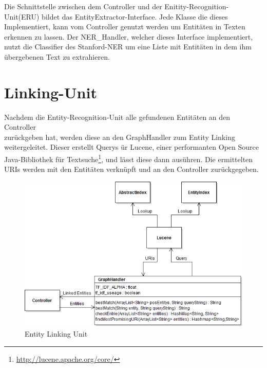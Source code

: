 \documentclass[11pt, a4paper, oneside]{Thesis} %
\begin{document}
Die Schnittstelle zwischen dem Controller und der Enitity-Recognition-Unit(ERU) bildet das EntityExtractor-Interface. Jede Klasse die dieses Implementiert, kann vom Controller genutzt werden um Entit\"aten in Texten erkennen zu lassen. Der NER\_Handler, welcher dieses Interface implementiert, nutzt die Classifier des Stanford-NER um eine Liste mit Entit\"aten in dem ihm \"ubergebenen Text zu extrahieren.

\section{Linking-Unit}
Nachdem die Entity-Recognition-Unit alle gefundenen Entit\"aten an den Controller\\ zurückgeben hat, werden diese an den GraphHandler zum Entity Linking weitergeleitet. Dieser erstellt Querys \"ur Lucene, einer performanten Open Source Java-Bibliothek f\"ur Textsuche\footnote{\url{http://lucene.apache.org/core/}}, und l\"asst diese dann aus\"uhren. Die ermittelten URIs werden mit den Entit\"aten verkn\"upft und an den Controller zur\"uckgegeben.
\begin{figure}[ht!]
\centering
\includegraphics[scale=0.55]{./entLinkImp.png}
\caption[Entity Linking Unit]{Entity Linking Unit}
\end{figure}
\end{document}

